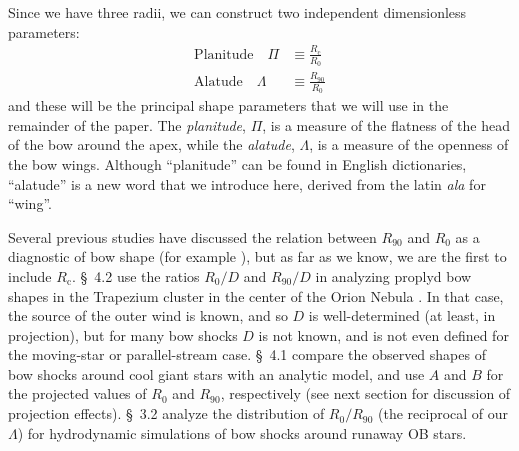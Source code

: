 \documentclass[useAMS, usenatbib, a4paper]{mnras}
\newcommand\C{\ensuremath{\mathrm{c}}}
\begin{document}
Since we have three radii, we can construct two independent
dimensionless parameters:
\begin{align}
  \label{eq:planitude}
  \text{Planitude} \quad \Pi & \equiv  \frac{R_{\C}} {R_0} \\
  \label{eq:alatude}
  \text{Alatude} \quad \Lambda & \equiv  \frac{R_{90}} {R_0}
\end{align}
and these will be the principal shape parameters that we will use in
the remainder of the paper.  The \textit{planitude}, \(\Pi\), is a
measure of the flatness of the head of the bow around the apex, while
the \textit{alatude}, \(\Lambda\), is a measure of the openness of the bow
wings.  Although ``planitude'' can be found in English dictionaries,
``alatude'' is a new word that we introduce here, derived from the
latin \textit{ala} for ``wing''.

Several previous studies have discussed the relation between
\(R_{90}\) and \(R_0\) as a diagnostic of bow shape (for example
\citealp{Robberto:2005a, Cox:2012a, Meyer:2016a}), but as far as we
know, we are the first to include \(R_{\C}\).  \citet{Robberto:2005a}
\S~4.2 use the ratios \(R_0/D\) and \(R_{90}/D\) in analyzing proplyd
bow shapes in the Trapezium cluster in the center of the Orion Nebula
\citep{Hayward:1994a, Garcia-Arredondo:2001a, Smith:2005a}.  In that
case, the source of the outer wind is known, and so \(D\) is
well-determined (at least, in projection), but for many bow shocks
\(D\) is not known, and is not even defined for the moving-star or
parallel-stream case. \citet{Cox:2012a} \S~4.1 compare the observed
shapes of bow shocks around cool giant stars with an analytic model,
and use \(A\) and \(B\) for the projected values of \(R_0\) and
\(R_{90}\), respectively (see next section for discussion of
projection effects).  \citet{Meyer:2016a} \S~3.2 analyze the
distribution of \(R_0 / R_{90}\) (the reciprocal of our \(\Lambda\)) for
hydrodynamic simulations of bow shocks around runaway OB stars.

\end{document}
